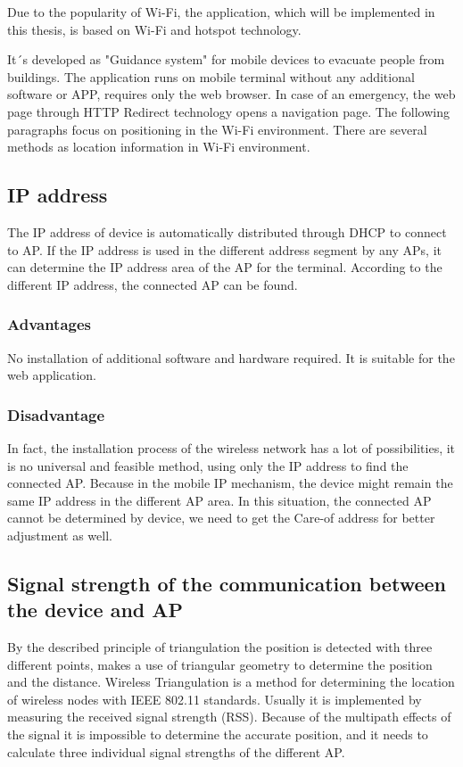 Due to the popularity of Wi-Fi, the application, which will be implemented in this thesis, is based on Wi-Fi and hotspot technology.  

It´s developed as "Guidance system" for mobile devices to evacuate people from buildings. The application runs on mobile terminal without any additional software or APP, requires only the web browser. In case of an emergency, the web page through HTTP Redirect technology opens a navigation page. The following paragraphs focus on positioning in the Wi-Fi environment. There are several methods as location information in Wi-Fi environment.


\subsection{IP address}  

The IP address of device is automatically distributed through DHCP to connect to AP. If the IP address is used in the different address segment by any APs, it can determine the IP address area of the AP for the terminal. According to the different IP address, the connected AP can be found.   

\subsubsection{Advantages}
  
No installation of additional software and hardware required. It is suitable for the web application.    

\subsubsection{Disadvantage}

In fact, the installation process of the wireless network has a lot of possibilities, it is no universal and feasible method, using only the IP address to find the connected AP. Because in the mobile IP mechanism, the device might remain the same IP address in the different AP area. In this situation, the connected AP cannot be determined by device, we need to get the Care-of address for better adjustment as well.   

\subsection{Signal strength of the communication between the device and AP}

By the described principle of triangulation the position is detected with three different points, makes a use of triangular geometry to determine the position and the distance. Wireless Triangulation is a method for determining the location of wireless nodes with IEEE 802.11 standards. Usually it is implemented by measuring the received signal strength (RSS). Because of the multipath effects of the signal it is impossible to determine the accurate position, and it needs to calculate three individual signal strengths of the different AP.     

